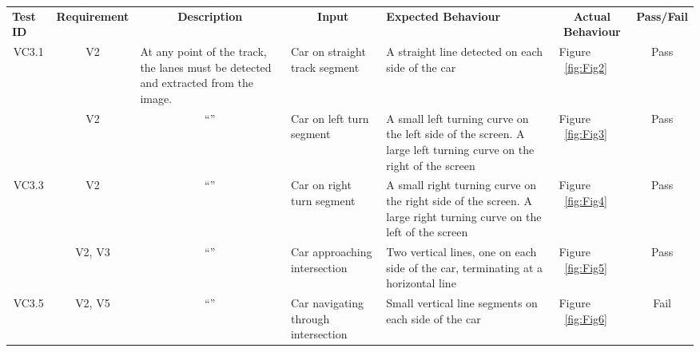 \documentclass [10pt]{article}
\begin{document}
\begin{longtable}{ | p{ } | p{ } |  p{ } |  p{ } | p{ } | p{ } |  p{ } |}  \hline

    \rowcolor{subsectionC}\textbf{Test ID} 
    & \multicolumn{1}{c|}{\textbf{Requirement} }
    & \multicolumn{1}{c|}{\textbf{Description} }
    & \multicolumn{1}{c|}{\textbf{Input} }
    & \textbf{Expected Behaviour} 
    & \multicolumn{1}{c|}{\textbf{Actual Behaviour} }
    & \textbf{Pass/Fail} \\  
    
    \multicolumn{1}{|c|}{VC3.1} 
    & \multicolumn{1}{c|}{V2}
    & At any point of the track, the lanes must be detected and extracted from the image.
    & Car on straight track segment
    & A straight line detected on each side of the car
    & Figure ~\ref{fig:Fig2}
    & \multicolumn{1}{c|}{Pass}\\  \hline
    
    
    \rowcolor{tableCell}\multicolumn{1}{|c|}{VC3.2} 
    & \multicolumn{1}{c|}{V2}
    & \multicolumn{1}{c|}{``''}
    & Car on left turn segment
    & A small left turning curve on the left side of the screen. A large left turning curve on the right of the screen 
    & Figure ~\ref{fig:Fig3}
    & \multicolumn{1}{c|}{Pass}\\ \hline
    
    
    \multicolumn{1}{|c|}{VC3.3} 
    & \multicolumn{1}{c|}{V2}
    & \multicolumn{1}{c|}{``''}
    & Car on right turn segment
    & A small right turning curve on the right side of the screen. A large right turning curve on the left of the screen 
    & Figure ~\ref{fig:Fig4}
    & \multicolumn{1}{c|}{Pass}\\ \hline
     
     
    \rowcolor{tableCell}\multicolumn{1}{|c|}{VC3.4} 
    &\multicolumn{1}{c|}{ V2, V3}
    & \multicolumn{1}{c|}{``''}
    & Car approaching intersection
    & Two vertical lines, one  on each side of the car, terminating at a horizontal line 
    & Figure ~\ref{fig:Fig5}
    & \multicolumn{1}{c|}{Pass}\\ \hline
    
    
    \multicolumn{1}{|c|}{VC3.5} 
    & \multicolumn{1}{c|}{V2, V5}
    & \multicolumn{1}{c|}{``''}
    & Car navigating through intersection
    & Small vertical line segments on each side of the car
    & Figure ~\ref{fig:Fig6}
    & \multicolumn{1}{c|}{Fail}\\ \hline
    

\end{longtable}
\end{document}
